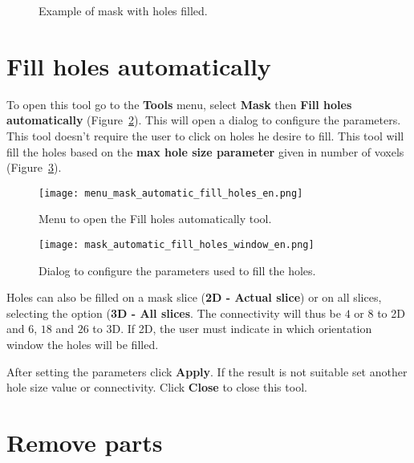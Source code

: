 \begin{figure}[!htb]
  \centering
    \qquad
  \hfill
  \caption{Example of mask with holes filled.}
  \label{fig:mask_fill_hole}
\end{figure}


\section{Fill holes automatically}

To open this tool go to the \textbf{Tools} menu, select \textbf{Mask} then \textbf{Fill holes automatically} (Figure~\ref{fig:menu_mask_automatic_fill_holes}). This will open a dialog to configure the parameters. This tool doesn’t require the user to click on holes he desire to fill. This tool will fill the holes based on the \textbf{max hole size parameter} given in number of voxels (Figure~\ref{fig:mask_automatic_fill_holes_window}).

\begin{figure}[!htb]
\centering
\texttt{[image: menu\_mask\_automatic\_fill\_holes\_en.png]}
\caption{Menu to open the Fill holes automatically tool.}
\label{fig:menu_mask_automatic_fill_holes}
\end{figure}

\begin{figure}[!htb]
\centering
\texttt{[image: mask\_automatic\_fill\_holes\_window\_en.png]}
\caption{Dialog to configure the parameters used to fill the holes.}
\label{fig:mask_automatic_fill_holes_window}
\end{figure}

Holes can also be filled on a mask slice (\textbf{2D - Actual slice}) or on all slices, selecting the option (\textbf{3D - All slices}. The connectivity will thus be $4$ or $8$ to 2D and $6$, $18$ and $26$ to 3D. If 2D, the user must indicate in which orientation window the holes will be filled.

After setting the parameters click \textbf{Apply}. If the result is not suitable set another hole size value or connectivity. Click \textbf{Close} to close this tool.

\section{Remove parts}

